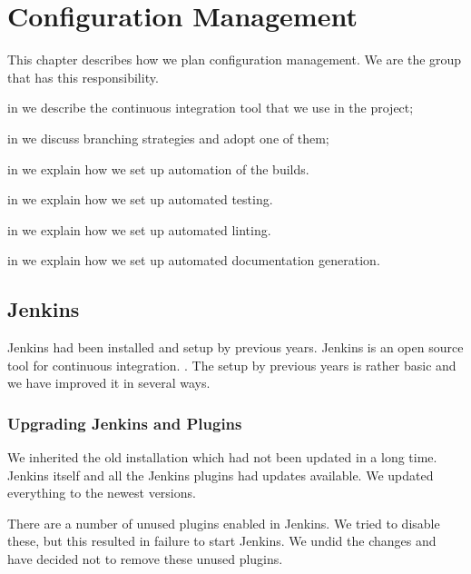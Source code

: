 \chapter{Configuration Management}\label{chap:config_management}
This chapter describes how we plan configuration management. We are the group that has this responsibility. \dummy~\dummy~\dummy~\dummy~\dummy~\dummy

\begin{chapterorganization}
  \item in  we describe the continuous integration tool that we use in the project;
  \item in  we discuss branching strategies and adopt one of them;
  \item in  we explain how we set up automation of the builds.
  \item in  we explain how we set up automated testing.
  \item in  we explain how we set up automated linting.
  \item in  we explain how we set up automated documentation generation.
\end{chapterorganization}

\section{Jenkins}\label{sec:jenkins}
Jenkins had been installed and setup by previous years. Jenkins is an open source tool for continuous integration. . The setup by previous years is rather basic and we have improved it in several ways.

\subsection{Upgrading Jenkins and Plugins}
We inherited the old installation which had not been updated in a long time. Jenkins itself and all the Jenkins plugins had updates available. We updated everything to the newest versions.

There are a number of unused plugins enabled in Jenkins. We tried to disable these, but this resulted in failure to start Jenkins. We undid the changes and have decided not to remove these unused plugins. 

